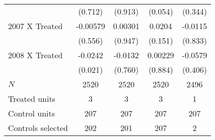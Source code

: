 {\begin{tabular}{l*{4}{c}}
          &  (0.712)         &  (0.913)         &  (0.054)         &  (0.344)         \\
[1em]
2007 X Treated& -0.00579         &  0.00301         &   0.0204         &  -0.0115         \\
          &  (0.556)         &  (0.947)         &  (0.151)         &  (0.833)         \\
[1em]
2008 X Treated&  -0.0242\sym{*}  &  -0.0132         &  0.00229         &  -0.0579         \\
          &  (0.021)         &  (0.760)         &  (0.884)         &  (0.406)         \\
\hline
\(N\)     &     2520         &     2520         &     2520         &     2496         \\
Treated units&        3         &        3         &        3         &        1         \\
Control units&      207         &      207         &      207         &      207         \\
Controls selected&      202         &      201         &      207         &        2         \\
\hline\hline
\end{tabular}
}
